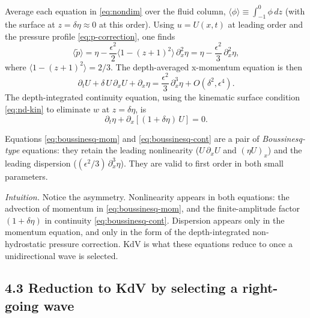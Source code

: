 \documentclass{article}
\begin{document}
Average each equation in \eqref{eq:nondim} over the fluid column, \(\langle \phi \rangle \equiv \int_{-1}^{0} \phi\, dz\) (with the surface at \(z = \delta \eta \approx 0\) at this order). Using \(u = U(x,t)\) at leading order and the pressure profile \eqref{eq:p-correction}, one finds
\[
\langle \tilde p \rangle = \eta - \frac{\epsilon^2}{2} \langle 1 - (z+1)^2 \rangle\, \partial_x^2 \eta = \eta - \frac{\epsilon^2}{3}\, \partial_x^2 \eta,
\]
where \(\langle 1 - (z+1)^2 \rangle = 2/3\). The depth-averaged x-momentum equation is then
\begin{equation}
\partial_t U + \delta\, U\, \partial_x U + \partial_x \eta = \frac{\epsilon^2}{3}\, \partial_x^3 \eta + O(\delta^2, \epsilon^4).
\label{eq:boussinesq-mom}
\end{equation}
The depth-integrated continuity equation, using the kinematic surface condition \eqref{eq:nd-kin} to eliminate \(w\) at \(z = \delta \eta\), is
\begin{equation}
\partial_t \eta + \partial_x\!\left[(1 + \delta \eta)\, U\right] = 0.
\label{eq:boussinesq-cont}
\end{equation}

Equations \eqref{eq:boussinesq-mom} and \eqref{eq:boussinesq-cont} are a pair of \emph{Boussinesq-type} equations: they retain the leading nonlinearity (\(U\,\partial_x U\) and \((\eta U)_x\)) and the leading dispersion (\((\epsilon^2/3)\, \partial_x^3 \eta\)). They are valid to first order in both small parameters.

\noindent\emph{Intuition.} Notice the asymmetry. Nonlinearity appears in both equations: the advection of momentum in \eqref{eq:boussinesq-mom}, and the finite-amplitude factor \((1 + \delta \eta)\) in continuity \eqref{eq:boussinesq-cont}. Dispersion appears only in the momentum equation, and only in the form of the depth-integrated non-hydrostatic pressure correction. KdV is what these equations reduce to once a unidirectional wave is selected.

\subsection*{4.3 Reduction to KdV by selecting a right-going wave}
\end{document}
